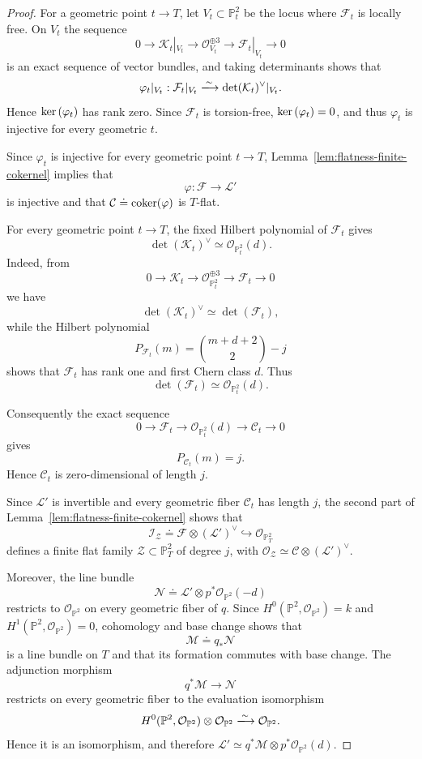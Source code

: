 \documentclass[11pt]{amsart} %
\newcommand{\lar}{\longrightarrow}
\theoremstyle{definition}
\def\ker{{\rm ker}\,}
\def\coker{\mbox{\rm coker}}
\def\NZQ{\mathbb}               %
\def\PP{{\NZQ P}}
\begin{document}
\begin{proof}
For a geometric point $t\lar T$, let
$V_t\subset\PP^2_t$ be the locus where $\mathcal F_t$ is locally
free. On $V_t$ the sequence
\[
0\longrightarrow\mathcal K_t|_{V_t}
\longrightarrow\mathcal O_{V_t}^{\oplus3}
\longrightarrow\mathcal F_t|_{V_t}
\longrightarrow0
\]
is an exact sequence of vector bundles, and taking determinants
shows that
\[
\varphi_t|_{V_t}:
\mathcal F_t|_{V_t}
\xlongrightarrow{\sim}
\det(\mathcal K_t)^\vee|_{V_t}.
\]
Hence $\ker(\varphi_t)$ has rank zero. Since
$\mathcal F_t$ is torsion-free, \(
\ker(\varphi_t)=0\), and thus $\varphi_t$ is injective for every geometric $t$.

Since $\varphi_t$ is injective for every geometric point $t\lar T$,
Lemma~\ref{lem:flatness-finite-cokernel} implies that
\[
\varphi:\mathcal F\longrightarrow\mathcal L'
\]
is injective and that \(\mathcal C\doteq\coker(\varphi)\) is $T$-flat.

For every geometric point $t\lar T$, the fixed Hilbert polynomial of
$\mathcal F_t$ gives
\[
\det(\mathcal K_t)^\vee\simeq\mathcal O_{\PP^2_t}(d).
\]
Indeed, from
\[
0\lar\mathcal K_t\lar\mathcal O_{\PP^2_t}^{\oplus3}
\lar\mathcal F_t\lar0
\]
we have
\[
\det(\mathcal K_t)^\vee\simeq\det(\mathcal F_t),
\]
while the Hilbert polynomial
\[
P_{\mathcal F_t}(m)
=
\binom{m+d+2}{2}-j
\]
shows that $\mathcal F_t$ has rank one and first Chern class $d$.
Thus
\[
\det(\mathcal F_t)\simeq\mathcal O_{\PP^2_t}(d).
\]

Consequently the exact sequence
\[
0\longrightarrow\mathcal F_t
\longrightarrow\mathcal O_{\PP^2_t}(d)
\longrightarrow\mathcal C_t
\longrightarrow0
\]
gives
\[
P_{\mathcal C_t}(m)=j.
\]
Hence $\mathcal C_t$ is zero-dimensional of length $j$.

Since $\mathcal L'$ is invertible and every geometric fiber
$\mathcal C_t$ has length $j$, the second part of
Lemma~\ref{lem:flatness-finite-cokernel} shows that
\[
\mathcal I_{\mathcal Z}
\doteq
\mathcal F\otimes(\mathcal L')^\vee
\hookrightarrow
\mathcal O_{\PP^2_T}
\]
defines a finite flat family
\(
\mathcal Z\subset\PP^2_T
\) of degree $j$, with \(
\mathcal O_{\mathcal Z}
\simeq
\mathcal C\otimes(\mathcal L')^\vee.
\)

Moreover, the line bundle
\[
\mathcal N
\doteq
\mathcal L'\otimes p^*\mathcal O_{\PP^2}(-d)
\]
restricts to $\mathcal O_{\PP^2}$ on every geometric fiber of $q$.
Since \(H^0(\PP^2,\mathcal O_{\PP^2})=k\) and \(H^1(\PP^2,\mathcal O_{\PP^2})=0\), cohomology and base change
\cite[Chapter~III, Theorem~12.11]{hartshorne2013algebraic}
shows that
\[
\mathcal M\doteq q_*\mathcal N
\]
is a line bundle on $T$ and that its formation commutes with base
change. The adjunction morphism
\[
q^*\mathcal M\longrightarrow\mathcal N
\]
restricts on every geometric fiber to the evaluation isomorphism
\[
H^0(\PP^2,\mathcal O_{\PP^2})\otimes
\mathcal O_{\PP^2}
\xlongrightarrow{\sim}
\mathcal O_{\PP^2}.
\]
Hence it is an isomorphism, and therefore \(\mathcal L'
\simeq q^*\mathcal M\otimes p^*\mathcal O_{\PP^2}(d)\).


\end{proof}
\end{document}
